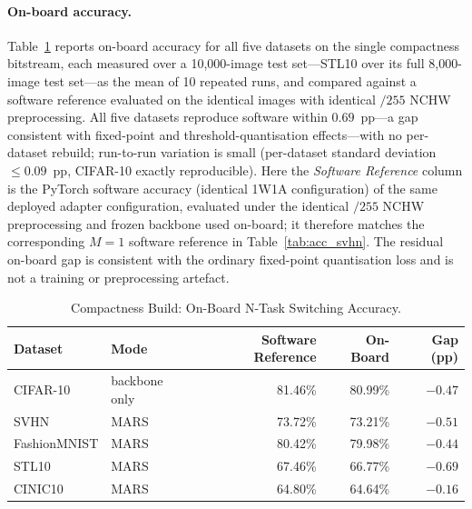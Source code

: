 \documentclass[12pt, a4paper]{report}
\numberwithin{equation}{chapter}
\numberwithin{figure}{chapter}
\numberwithin{table}{chapter}
\numberwithin{algorithm}{chapter}
\begin{document}
\paragraph{On-board accuracy.}
Table~\ref{tab:pe1_3ds_acc} reports on-board accuracy for all five datasets on the single compactness bitstream, each measured over a 10{,}000-image test set---STL10 over its full 8{,}000-image test set---as the mean of 10 repeated runs, and compared against a software reference evaluated on the identical images with identical $/255$ NCHW preprocessing. All five datasets reproduce software within $0.69$~pp---a gap consistent with fixed-point and threshold-quantisation effects---with no per-dataset rebuild; run-to-run variation is small (per-dataset standard deviation $\leq 0.09$~pp, CIFAR-10 exactly reproducible). Here the \emph{Software Reference} column is the PyTorch software accuracy (identical 1W1A configuration) of the same deployed adapter configuration, evaluated under the identical $/255$ NCHW preprocessing and frozen backbone used on-board; it therefore matches the corresponding $M{=}1$ software reference in Table~\ref{tab:acc_svhn}. The residual on-board gap is consistent with the ordinary fixed-point quantisation loss and is not a training or preprocessing artefact.

\begin{table}[H]
\centering
\caption{Compactness Build: On-Board N-Task Switching Accuracy.}
\label{tab:pe1_3ds_acc}
\begin{tabular}{llrrr}
\toprule
\textbf{Dataset} & \textbf{Mode} & \textbf{Software Reference} & \textbf{On-Board} & \textbf{Gap (pp)} \\
\midrule
CIFAR-10     & backbone only    & 81.46\% & 80.99\% & $-0.47$ \\
SVHN         & MARS & 73.72\% & 73.21\% & $-0.51$ \\
FashionMNIST & MARS & 80.42\% & 79.98\% & $-0.44$ \\
STL10        & MARS & 67.46\% & 66.77\% & $-0.69$ \\
CINIC10      & MARS & 64.80\% & 64.64\% & $-0.16$ \\
\bottomrule
\end{tabular}
\end{table}
\end{document}
